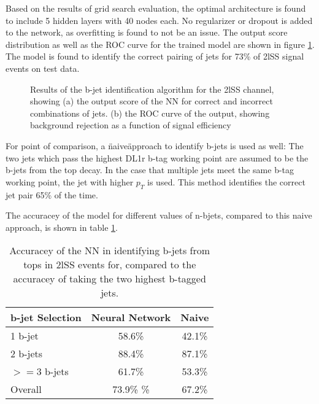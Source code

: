 Based on the results of grid search evaluation, the optimal architecture is found to include 5 hidden layers with 40 nodes each. No regularizer or dropout is added to the network, as overfitting is found to not be an issue. The output score distribution as well as the ROC curve for the trained model are shown in figure \ref{fig:top2lSSresults}. The model is found to identify the correct pairing of jets for 73\% of 2lSS signal events on test data.

\begin{figure}[h!]
  \label{fig:top2lSSresults}
  \caption{Results of the b-jet identification algorithm for the 2lSS channel, showing (a) the output score of the NN for correct and incorrect combinations of jets. (b) the ROC curve of the output, showing background rejection as a function of signal efficiency}
\end{figure}

For point of comparison, a \"naive\" approach to identify b-jets is used as well: The two jets which pass the highest DL1r b-tag working point are assumed to be the b-jets from the top decay. In the case that multiple jets meet the same b-tag working point, the jet with higher $p_T$ is used. This method identifies the correct jet pair 65\% of the time. 

The accuracey of the model for different values of n-bjets, compared to this naive approach, is shown in table \ref{tab:topMatchAcc2lSS}.

\begin{table}[h!]
  \centering
  \caption{Accuracey of the NN in identifying b-jets from tops in 2lSS events for, compared to the accuracey of taking the two highest b-tagged jets.}
  \begin{tabular}{l|c|c}
    \hline\hline
    b-jet Selection & Neural Network & Naive \\
    \hline
    1 b-jet & 58.6\% & 42.1\% \\
    2 b-jets & 88.4\% & 87.1\% \\
    $>=$3 b-jets & 61.7\% & 53.3\% \\
    \hline
    Overall & 73.9\% \% & 67.2\% \\                                                                                  
    \hline                                                                                                 
  \end{tabular}
  \label{tab:topMatchAcc2lSS}                                                                                           
\end{table}

